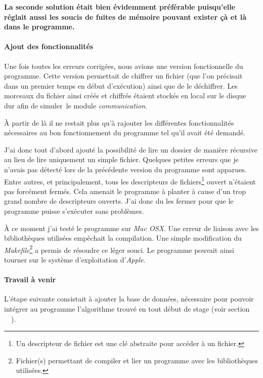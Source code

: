 \documentclass[a4paper,10pt, twoside]{report}
\begin{document}
\begin{spacing}{1.2}
\textbf{La seconde solution était bien évidemment préférable puisqu'elle
réglait aussi les soucis de fuites de mémoire pouvant exister çà et
là dans le programme.}

\paragraph{Ajout des fonctionnalités}

\bigskip

Une fois toutes les erreurs corrigées, nous avions une version fonctionnelle
du programme. Cette version permettait de chiffrer un fichier (que l'on
précisait dans un premier temps en début d'exécution) ainsi que de le
déchiffrer. Les morceaux du fichier ainsi créés et chiffrés étaient
stockés en local sur le disque dur afin de \flqq simuler\frqq~le module
\textit{communication}.

À partir de là il ne restait plus qu'à rajouter les différentes
fonctionnalités nécessaires au bon fonctionnement du programme tel qu'il
avait été demandé.

J'ai donc tout d'abord ajouté la possibilité de lire un dossier de
manière récursive au lieu de lire uniquement un simple fichier. Quelques
petites erreurs que je n'avais pas détecté lors de la précédente
version du programme sont apparues. Entre autres, et principalement, tous les
descripteurs de fichiers\footnote{Un descripteur de fichier est une clé
abstraite pour accéder à un fichier.} ouvert n'étaient pas forcément
fermés. Cela amenait le programme à planter à cause d'un trop grand
nombre de descripteurs ouverts. J'ai donc du les fermer pour que le programme
puisse s'exécuter sans problèmes.

À ce moment j'ai testé le programme sur \textit{Mac OSX}. Une erreur de
liaison avec les bibliothèques utilisées empêchait la compilation. Une
simple modification du \textit{Makefile}\footnote{Fichier(s) permettant de
compiler et lier un programme avec les bibliothèques utilisées.} a permis
de résoudre ce léger souci. Le programme pouvait ainsi tourner sur le
système d'exploitation d'\textit{Apple}.

\paragraph{Travail à venir}

\bigskip

L'étape suivante consistait à ajouter la base de données, nécessaire
pour pouvoir intégrer au programme l'algorithme trouvé en tout début de
stage (voir section \flqq~~\frqq).


\end{spacing}
\end{document}
